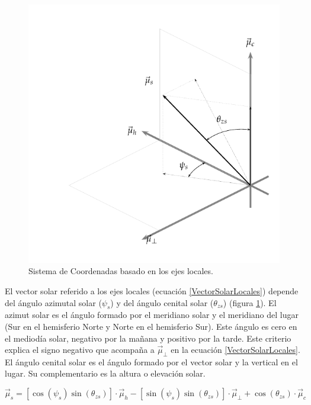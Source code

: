 %
\begin{figure}
\includegraphics{../figs/SistemaCoordenadasLocal}

\caption{Sistema de Coordenadas basado en los ejes locales.\label{fig:CoordenadasLocales}}

\end{figure}


El vector solar referido a los ejes locales (ecuación \ref{VectorSolarLocales})
depende del ángulo azimutal solar ($\psi_{s}$) y del ángulo cenital
solar ($\theta_{zs}$) (figura \ref{fig:CoordenadasLocales}). El
azimut solar es el ángulo formado por el meridiano solar y el meridiano
del lugar (Sur en el hemisferio Norte y Norte en el hemisferio Sur).
Este ángulo es cero en el mediodía solar, negativo por la mañana y
positivo por la tarde.  
Este criterio explica el signo negativo que acompaña a $\vec{\mu}_{\bot}$
en la ecuación \ref{VectorSolarLocales}. El ángulo cenital solar
es el ángulo formado por el vector solar y la vertical en el lugar.
Su complementario es la altura o elevación solar.

\begin{equation}
\vec{\mu}_{s}=\left[\cos\left(\psi_{s}\right)\sin\left(\theta_{zs}\right)\right]\cdot\vec{\mu}_{h}-\left[\sin\left(\psi_{s}\right)\sin\left(\theta_{zs}\right)\right]\cdot\vec{\mu}_{\bot}+\cos\left(\theta_{zs}\right)\cdot\vec{\mu}_{c}\label{VectorSolarLocales}\end{equation}


